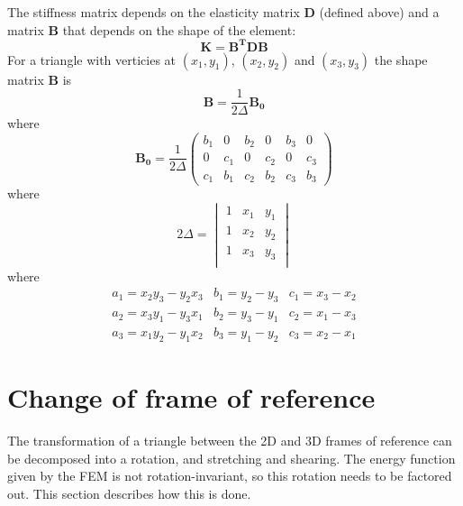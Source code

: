 \documentclass{article}
\renewcommand{\vec}[1]{\mathbf{#1}}
\begin{document}
The stiffness matrix depends
on the elasticity matrix $\vec{D}$ (defined above) and a matrix
$\vec{B}$ that depends on the shape of the element:
\begin{displaymath}
  \vec{K} = \vec{B^T}\vec{D}\vec{B}
\end{displaymath}
For a triangle with verticies at $(x_1, y_1)$, $(x_2, y_2)$ and $(x_3,
y_3)$ the shape matrix $\vec{B}$ is
\begin{displaymath}
  \vec{B} = \frac{1}{2\Delta}\vec{B_0}
\end{displaymath}
where
\begin{displaymath}
  \vec{B_0} = \frac{1}{2\Delta}
  \begin{pmatrix}
    b_1 & 0  & b_2 & 0 & b_3 & 0 \\
    0  & c_1 & 0  & c_2 & 0 & c_3 \\
    c_1 & b_1 & c_2 & b_2 & c_3 & b_3
  \end{pmatrix}
\end{displaymath}
where
\begin{displaymath}
  2\Delta =
  \begin{vmatrix}
    1 & x_1 & y_1 \\
    1 & x_2 & y_2 \\
    1 & x_3 & y_3 \\
  \end{vmatrix}
\end{displaymath}
where
\begin{displaymath}
  \begin{array}{lll}
    a_1 = x_2y_3 - y_2x_3 &
    b_1 = y_2 - y_3 &
    c_1 = x_3 - x_2 \\
    a_2 = x_3y_1 - y_3x_1 &
    b_2 = y_3 - y_1 &
    c_2 = x_1 - x_3 \\
    a_3 = x_1y_2 - y_1x_2 &
    b_3 = y_1 - y_2 &
    c_3 = x_2 - x_1 
  \end{array}
\end{displaymath}

\section{Change of frame of reference}
\label{fem:sec:workings-so-far}

The transformation of a triangle between the 2D and 3D frames of
reference can be decomposed into a rotation, and stretching and
shearing. The energy function given by the FEM is not
rotation-invariant, so this rotation needs to be factored out. This
section describes how this is done.
\end{document}
